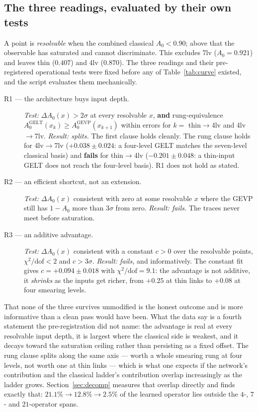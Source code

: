 \documentclass[11pt,a4paper]{article}
\newcommand{\Azero}{A_0}
\newcommand{\dAzero}{\Delta A_0}
\begin{document}
\subsection{The three readings, evaluated by their own tests}
\label{sec:readings}

A point is \emph{resolvable} when the combined classical $\Azero < 0.90$;
above that the observable has saturated and cannot discriminate. This excludes
7lv ($\Azero = 0.921$) and leaves thin ($0.407$) and 4lv ($0.870$). The three
readings and their pre-registered operational tests were fixed before any of
Table~\ref{tab:curve} existed, and the script evaluates them mechanically.

\begin{description}
  \item[R1 --- the architecture buys input depth.] \emph{Test:} $\dAzero(x) >
        2\sigma$ at every resolvable $x$, \textbf{and} rung-equivalence
        $\Azero^{\text{GELT}}(x_k) \ge \Azero^{\text{GEVP}}(x_{k+1})$ within
        errors for $k =$ thin$\to$4lv and 4lv$\to$7lv.
        \emph{Result: splits.} The first clause holds cleanly. The rung clause
        holds for 4lv$\to$7lv ($+0.038 \pm 0.024$: a four-level GELT matches the
        seven-level classical basis) and \textbf{fails} for thin$\to$4lv
        ($-0.201 \pm 0.048$: a thin-input GELT does not reach the four-level
        basis). R1 does not hold as stated.
  \item[R2 --- an efficient shortcut, not an extension.] \emph{Test:}
        $\dAzero(x)$ consistent with zero at some resolvable $x$ where the GEVP
        still has $1-\Azero$ more than $3\sigma$ from zero.
        \emph{Result: fails.} The traces never meet before saturation.
  \item[R3 --- an additive advantage.] \emph{Test:} $\dAzero(x)$ consistent with
        a constant $c > 0$ over the resolvable points, $\chi^2/\text{dof} < 2$
        and $c > 3\sigma$. \emph{Result: fails,} and informatively. The constant
        fit gives $c = +0.094 \pm 0.018$ with $\chi^2/\text{dof} = 9.1$: the
        advantage is not additive, it \emph{shrinks} as the inputs get richer,
        from $+0.25$ at thin links to $+0.08$ at four smearing levels.
\end{description}

That none of the three survives unmodified is the honest outcome and is more
informative than a clean pass would have been. What the data say is a fourth
statement the pre-registration did not name: the advantage is real at every
resolvable input depth, it is largest where the classical side is weakest, and
it decays toward the saturation ceiling rather than persisting as a fixed
offset. The rung clause splits along the same axis --- worth a whole smearing
rung at four levels, not worth one at thin links --- which is what one expects
if the network's contribution and the classical ladder's contribution overlap
increasingly as the ladder grows. Section~\ref{sec:decomp} measures that overlap
directly and finds exactly that: $21.1\% \to 12.8\% \to 2.5\%$ of the learned
operator lies outside the $4$-, $7$- and $21$-operator spans.
\end{document}
